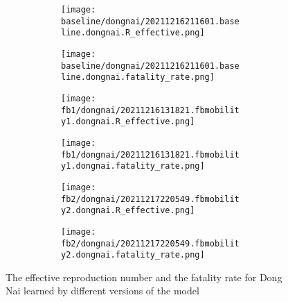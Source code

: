\begin{figure}[!htb]
    \centering

    \begin{subfigure}[b]{\linewidth}
        \centering
        \begin{subfigure}[b]{0.4\linewidth}
            \texttt{[image: baseline/dongnai/20211216211601.baseline.dongnai.R\_effective.png]}
        \end{subfigure}
        \begin{subfigure}[b]{0.4\linewidth}
            \texttt{[image: baseline/dongnai/20211216211601.baseline.dongnai.fatality\_rate.png]}
        \end{subfigure}
    \end{subfigure}

    \begin{subfigure}[b]{\linewidth}
        \centering
        \begin{subfigure}[b]{0.4\linewidth}
            \texttt{[image: fb1/dongnai/20211216131821.fbmobility1.dongnai.R\_effective.png]}
        \end{subfigure}
        \begin{subfigure}[b]{0.4\linewidth}
            \texttt{[image: fb1/dongnai/20211216131821.fbmobility1.dongnai.fatality\_rate.png]}
        \end{subfigure}
    \end{subfigure}

    \begin{subfigure}[b]{\linewidth}
        \centering
        \begin{subfigure}[b]{0.4\linewidth}
            \texttt{[image: fb2/dongnai/20211217220549.fbmobility2.dongnai.R\_effective.png]}
        \end{subfigure}
        \begin{subfigure}[b]{0.4\linewidth}
            \texttt{[image: fb2/dongnai/20211217220549.fbmobility2.dongnai.fatality\_rate.png]}
        \end{subfigure}
    \end{subfigure}

    \caption{The effective reproduction number and the fatality rate for Dong Nai learned by different versions of the model}
    \label{fig:R0-and-fatality-dongnai}
\end{figure}

